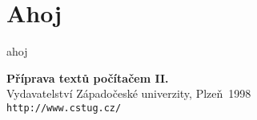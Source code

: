 \documentclass[12pt,twoside,a4paper]{article}
\begin{document}
\coverpagestarts
\pagebreak
\tableofcontents
\pagebreak

\section{Ahoj}
ahoj
\cite{SOME}
\pagebreak



\begin{thebibliography}{1}
               {\bf Příprava textů počítačem II.} \\
           Vydavatelství Západočeské univerzity,
           Plzeň~1998
  \\
               \texttt{http://www.cstug.cz/}
\end{thebibliography}
\end{document}
